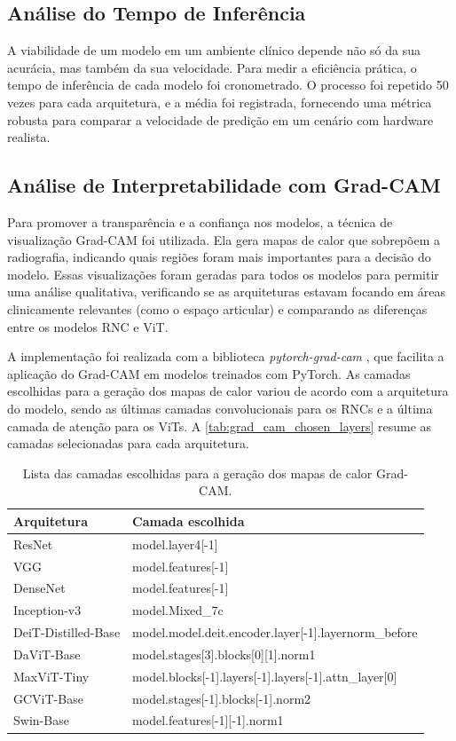 \subsection{Análise do Tempo de Inferência}

A viabilidade de um modelo em um ambiente clínico depende não só da sua acurácia, mas também da sua velocidade. Para medir a eficiência prática, o tempo de inferência de cada modelo foi cronometrado. O processo foi repetido 50 vezes para cada arquitetura, e a média foi registrada, fornecendo uma métrica robusta para comparar a velocidade de predição em um cenário com hardware realista.

\subsection{Análise de Interpretabilidade com Grad-CAM}

Para promover a transparência e a confiança nos modelos, a técnica de visualização Grad-CAM foi utilizada. Ela gera mapas de calor que sobrepõem a radiografia, indicando quais regiões foram mais importantes para a decisão do modelo. Essas visualizações foram geradas para todos os modelos para permitir uma análise qualitativa, verificando se as arquiteturas estavam focando em áreas clinicamente relevantes (como o espaço articular) e comparando as diferenças entre os modelos RNC e ViT.

A implementação foi realizada com a biblioteca \textit{pytorch-grad-cam} \citep{jacobgilpytorchcam}, que facilita a aplicação do Grad-CAM em modelos treinados com PyTorch. As camadas escolhidas para a geração dos mapas de calor variou de acordo com a arquitetura do modelo, sendo as últimas camadas convolucionais para os RNCs e a última camada de atenção para os ViTs. A \autoref{tab:grad_cam_chosen_layers} resume as camadas selecionadas para cada arquitetura.

\begin{table}[ht]
    \centering
    \begin{tabular}{ll}
        \toprule
        \textbf{Arquitetura} & \textbf{Camada escolhida} \\
        \midrule
        ResNet & model.layer4[-1] \\
        VGG & model.features[-1] \\
        DenseNet & model.features[-1] \\
        Inception-v3 & model.Mixed\_7c \\
        DeiT-Distilled-Base & model.model.deit.encoder.layer[-1].layernorm\_before \\
        DaViT-Base & model.stages[3].blocks[0][1].norm1 \\
        MaxViT-Tiny & model.blocks[-1].layers[-1].layers[-1].attn\_layer[0] \\
        GCViT-Base & model.stages[-1].blocks[-1].norm2 \\
        Swin-Base & model.features[-1][-1].norm1 \\
        \bottomrule
    \end{tabular}
    \caption{Lista das camadas escolhidas para a geração dos mapas de calor Grad-CAM.}
    \label{tab:grad_cam_chosen_layers}
\end{table}

